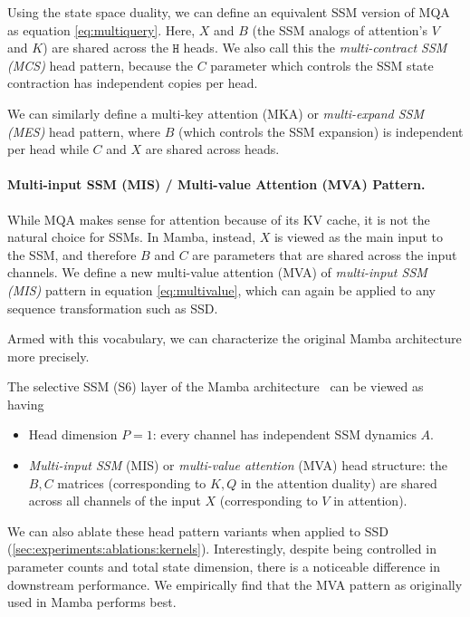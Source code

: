 Using the state space duality, we can define an equivalent SSM version of MQA as equation \eqref{eq:multiquery}.
Here, $X$ and $B$ (the SSM analogs of attention's $V$ and $K$) are shared across the $\mathtt{H}$ heads.
We also call this the \emph{multi-contract SSM (MCS)} head pattern, because the $C$ parameter which controls the SSM state contraction has independent copies per head.

We can similarly define a multi-key attention (MKA) or \emph{multi-expand SSM (MES)} head pattern,
where $B$ (which controls the SSM expansion) is independent per head while $C$ and $X$ are shared across heads.

\paragraph{Multi-input SSM (MIS) / Multi-value Attention (MVA) Pattern.}

While MQA makes sense for attention because of its KV cache, it is not the natural choice for SSMs.
In Mamba, instead, $X$ is viewed as the main input to the SSM,
and therefore $B$ and $C$ are parameters that are shared across the input channels.
We define a new multi-value attention (MVA) of \emph{multi-input SSM (MIS)} pattern in equation \eqref{eq:multivalue}, which can again be applied to any sequence transformation such as SSD.

Armed with this vocabulary, we can characterize the original Mamba architecture more precisely.
\begin{proposition}
  \label{prop:mamba-multihead}
  The selective SSM (S6) layer of the Mamba architecture~\citep{gu2023mamba} can be viewed as having
  \begin{itemize}
    \item Head dimension $P=1$: every channel has independent SSM dynamics $A$.
    \item \emph{Multi-input SSM} (MIS) or \emph{multi-value attention} (MVA) head structure: the $B, C$ matrices (corresponding to $K, Q$ in the attention duality) are shared across all channels of the input $X$ (corresponding to $V$ in attention).
  \end{itemize}
\end{proposition}

We can also ablate these head pattern variants when applied to SSD (\cref{sec:experiments:ablations:kernels}).
Interestingly, despite being controlled in parameter counts and total state dimension,
there is a noticeable difference in downstream performance.
We empirically find that the MVA pattern as originally used in Mamba performs best.


